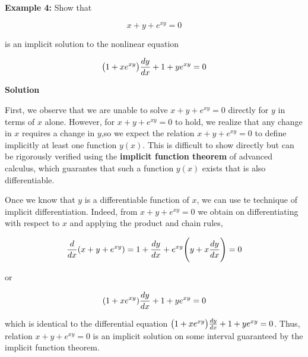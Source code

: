 \nopagenumbers
{\bf Example 4:} Show that

$$x+y+e^{xy}=0$$

is an implicit solution to the nonlinear equation

$$\bigl(1+xe^{xy}\bigr){dy\over dx}+1+ye^{xy}=0$$

\vskip 10pt
{\bf Solution}

\vskip 6pt
First, we observe that we are unable to solve $x+y+e^{xy}=0$ directly for $y$ in terms of $x$ alone. However, for $x+y+e^{xy}=0$ to hold, we realize that any change in $x$ requires a change in $y$,so we expect the relation $x+y+e^{xy}=0$ to define implicitly at least one function $y(x)$. This is difficult to show directly but can be rigorously verified using the {\bf implicit function theorem} of advanced calculus, which guarantes that such a function $y(x)$ exists that is also differentiable.

\vskip 1mm
Once we know that $y$ is a differentiable function of $x$, we can use te technique of implicit differentiation. Indeed, from $x+y+e^{xy}=0$ we obtain on differentiating with respect to $x$ and applying the product and chain rules,

$${d\over dx}(x+y+e^{xy})=1+{dy\over dx}+e^{xy}\Biggl(y+x{dy\over dx}\Biggr)=0$$

or

$$(1+xe^{xy}){dy\over dx}+1+ye^{xy}=0$$

which is identical to the differential equation $\bigl(1+xe^{xy}\bigr){dy\over dx}+1+ye^{xy}=0$. Thus, relation $x+y+e^{xy}=0$ is an implicit solution on some interval guaranteed by the implicit function theorem.

\vfill\eject
\bye
